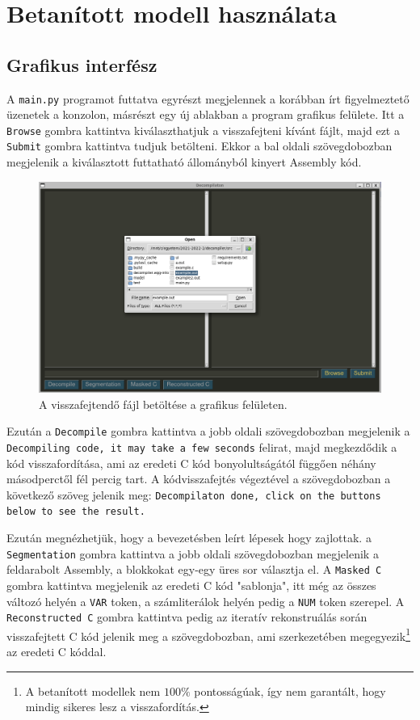 \section{Betanított modell használata}
\subsection{Grafikus interfész}
A \texttt{main.py} programot futtatva egyrészt megjelennek a korábban írt
figyelmeztető üzenetek a konzolon, másrészt egy új ablakban a program grafikus
felülete. Itt a \texttt{Browse} gombra kattintva kiválaszthatjuk
a visszafejteni kívánt fájlt, majd ezt a \texttt{Submit} gombra kattintva
tudjuk betölteni. Ekkor a bal oldali szövegdobozban megjelenik a kiválasztott futtatható
állományból kinyert Assembly kód.

\begin{figure}[H]
	\centering
	\includegraphics[width=1.0\textwidth]{images/file_browse.png}
	\caption{A visszafejtendő fájl betöltése a grafikus felületen.}
	\label{fig:file_browse}
\end{figure}

Ezután a \texttt{Decompile} gombra kattintva a jobb oldali szövegdobozban megjelenik
a \texttt{Decompiling code, it may take a few seconds} felirat, majd
megkezdődik a kód visszafordítása, ami az eredeti C kód bonyolultságától
függően néhány másodperctől fél percig tart. A kódvisszafejtés végeztével
a szövegdobozban a következő szöveg jelenik meg: \texttt{Decompilaton done,
click on the buttons below to see the result.}

Ezután megnézhetjük, hogy
a bevezetésben leírt lépesek hogy zajlottak. a \texttt{Segmentation} gombra
kattintva a jobb oldali szövegdobozban megjelenik a feldarabolt Assembly,
a blokkokat egy-egy üres sor választja el. A \texttt{Masked C} gombra kattintva
megjelenik az eredeti C kód "sablonja", itt még az összes változó helyén
a \texttt{VAR} token, a számliterálok helyén pedig a \texttt{NUM} token
szerepel. A \texttt{Reconstructed C} gombra kattintva pedig az iteratív
rekonstruálás során visszafejtett C kód jelenik meg a szövegdobozban, ami
szerkezetében megegyezik\footnote{A betanított modellek nem $100\%$
pontosságúak, így nem garantált, hogy mindig sikeres lesz a visszafordítás.} az
eredeti C kóddal.

